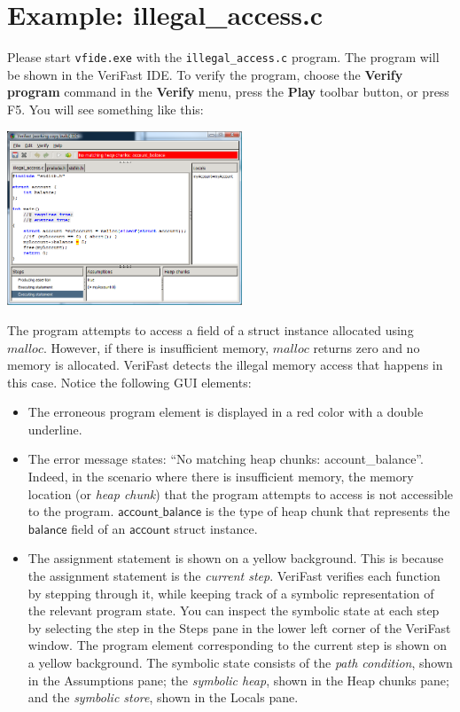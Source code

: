 \documentclass{article}
\begin{document}
\section{Example: illegal\_access.c}

Please start \texttt{vfide.exe} with the
\texttt{illegal\_access.c} program. The program will be shown
in the VeriFast IDE. To verify the program, choose the
\textbf{Verify program} command in the \textbf{Verify} menu,
press the \textbf{Play} toolbar button, or press F5. You will
see something like this:
\begin{center}
\includegraphics[width=7cm]{illegal_access.png}
\end{center}
The program attempts to access a field of a struct instance
allocated using $\mathit{malloc}$. However, if there is
insufficient memory, $\mathit{malloc}$ returns zero and no
memory is allocated. VeriFast detects the illegal memory access
that happens in this case. Notice the following GUI elements:
\begin{itemize}
\item The erroneous program element is displayed in a red
    color with a double underline.
\item The error message states: ``No matching heap chunks:
    account\_balance''. Indeed, in the scenario where there
    is insufficient memory, the memory location (or
    \emph{heap chunk}) that the program attempts to access
    is not accessible to the program.
    $\mathsf{account\_balance}$ is the type of heap chunk
    that represents the $\mathsf{balance}$ field of an
    $\mathsf{account}$ struct instance.
\item The assignment statement is shown on a yellow
    background. This is because the assignment statement is
    the \emph{current step}. VeriFast verifies each
    function by stepping through it, while keeping track of
    a symbolic representation of the relevant program
    state. You can inspect the symbolic state at each step
    by selecting the step in the Steps pane in the lower
    left corner of the VeriFast window. The program element
    corresponding to the current step is shown on a yellow
    background. The symbolic state consists of the
    \emph{path condition}, shown in the Assumptions pane;
    the \emph{symbolic heap}, shown in the Heap chunks
    pane; and the \emph{symbolic store}, shown in the
    Locals pane.
\end{itemize}
\end{document}
